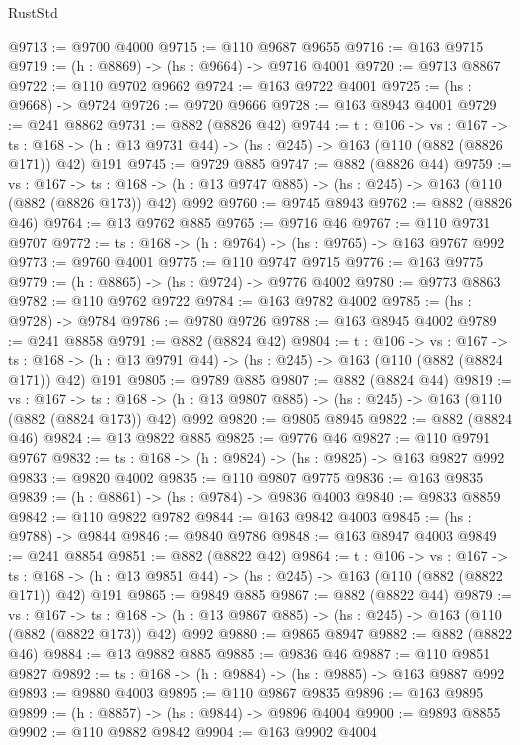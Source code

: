 \begin{lexlean}{RustStd}
\begin{coremodule}
@9713 := @9700 @4000
@9715 := @110 @9687 @9655
@9716 := @163 @9715
@9719 := (h : @8869) -> (hs : @9664) -> @9716 @4001
@9720 := @9713 @8867
@9722 := @110 @9702 @9662
@9724 := @163 @9722 @4001
@9725 := (hs : @9668) -> @9724
@9726 := @9720 @9666
@9728 := @163 @8943 @4001
@9729 := @241 @8862
@9731 := @882 (@8826 @42)
@9744 := {t : @106} ->
  {vs : @167} ->
  {ts : @168} -> (h : @13 @9731 @44) -> (hs : @245) -> @163 (@110 (@882 (@8826 @171)) @42) @191
@9745 := @9729 @885
@9747 := @882 (@8826 @44)
@9759 := {vs : @167} ->
  {ts : @168} -> (h : @13 @9747 @885) -> (hs : @245) -> @163 (@110 (@882 (@8826 @173)) @42) @992
@9760 := @9745 @8943
@9762 := @882 (@8826 @46)
@9764 := @13 @9762 @885
@9765 := @9716 @46
@9767 := @110 @9731 @9707
@9772 := {ts : @168} -> (h : @9764) -> (hs : @9765) -> @163 @9767 @992
@9773 := @9760 @4001
@9775 := @110 @9747 @9715
@9776 := @163 @9775
@9779 := (h : @8865) -> (hs : @9724) -> @9776 @4002
@9780 := @9773 @8863
@9782 := @110 @9762 @9722
@9784 := @163 @9782 @4002
@9785 := (hs : @9728) -> @9784
@9786 := @9780 @9726
@9788 := @163 @8945 @4002
@9789 := @241 @8858
@9791 := @882 (@8824 @42)
@9804 := {t : @106} ->
  {vs : @167} ->
  {ts : @168} -> (h : @13 @9791 @44) -> (hs : @245) -> @163 (@110 (@882 (@8824 @171)) @42) @191
@9805 := @9789 @885
@9807 := @882 (@8824 @44)
@9819 := {vs : @167} ->
  {ts : @168} -> (h : @13 @9807 @885) -> (hs : @245) -> @163 (@110 (@882 (@8824 @173)) @42) @992
@9820 := @9805 @8945
@9822 := @882 (@8824 @46)
@9824 := @13 @9822 @885
@9825 := @9776 @46
@9827 := @110 @9791 @9767
@9832 := {ts : @168} -> (h : @9824) -> (hs : @9825) -> @163 @9827 @992
@9833 := @9820 @4002
@9835 := @110 @9807 @9775
@9836 := @163 @9835
@9839 := (h : @8861) -> (hs : @9784) -> @9836 @4003
@9840 := @9833 @8859
@9842 := @110 @9822 @9782
@9844 := @163 @9842 @4003
@9845 := (hs : @9788) -> @9844
@9846 := @9840 @9786
@9848 := @163 @8947 @4003
@9849 := @241 @8854
@9851 := @882 (@8822 @42)
@9864 := {t : @106} ->
  {vs : @167} ->
  {ts : @168} -> (h : @13 @9851 @44) -> (hs : @245) -> @163 (@110 (@882 (@8822 @171)) @42) @191
@9865 := @9849 @885
@9867 := @882 (@8822 @44)
@9879 := {vs : @167} ->
  {ts : @168} -> (h : @13 @9867 @885) -> (hs : @245) -> @163 (@110 (@882 (@8822 @173)) @42) @992
@9880 := @9865 @8947
@9882 := @882 (@8822 @46)
@9884 := @13 @9882 @885
@9885 := @9836 @46
@9887 := @110 @9851 @9827
@9892 := {ts : @168} -> (h : @9884) -> (hs : @9885) -> @163 @9887 @992
@9893 := @9880 @4003
@9895 := @110 @9867 @9835
@9896 := @163 @9895
@9899 := (h : @8857) -> (hs : @9844) -> @9896 @4004
@9900 := @9893 @8855
@9902 := @110 @9882 @9842
@9904 := @163 @9902 @4004

\end{coremodule}
\end{lexlean}
